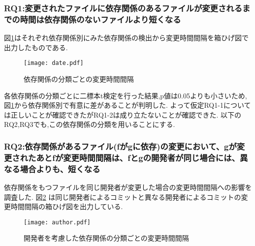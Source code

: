 \documentclass{fose2016}           %
\begin{document}
\subsubsection*{RQ1:変更されたファイルに依存関係のあるファイルが変更されるまでの時間は依存関係のないファイルより短くなる}
図\ref{fig:subdate}はそれぞれ依存関係別にみた依存関係の検出から変更時間間隔を箱ひげ図で出力したものである.　　

\begin{figure}
\centering
\texttt{[image: date.pdf]}
\caption{依存関係の分類ごとの変更時間間隔}
\label{fig:subdate} 
\end{figure}

各依存関係の分類ごとに二標本t検定を行った結果,p値は0.05よりも小さいため,図\ref{fig:subdate}から依存関係別で有意に差があることが判明した.
よって仮定RQ1-1については正しいことが確認できたがRQ1-2は成り立たないことが確認できた.
以下のRQ2,RQ3でも,この依存関係の分類を用いることにする.


\subsubsection*{RQ2:依存関係があるファイル(fがgに依存)の変更において、gが変更されたあとfが変更時間間隔は、fとgの開発者が同じ場合には、異なる場合よりも、短くなる}
依存関係をもつファイルを同じ開発者が変更した場合の変更時間間隔への影響を調査した.
図\ref{fig:author_subdate} は同じ開発者によるコミットと異なる開発者によるコミットの変更時間間隔の箱ひげ図を出力している.


\begin{figure}
\centering
\texttt{[image: author.pdf]}
\caption{開発者を考慮した依存関係の分類ごとの変更時間間隔}
\label{fig:author_subdate} 
\end{figure}
\end{document}
